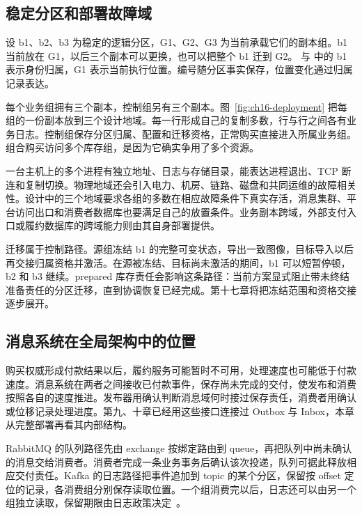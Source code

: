 
\subsection{稳定分区和部署故障域}

设 b1、b2、b3 为稳定的逻辑分区，G1、G2、G3 为当前承载它们的副本组。b1 当前放在 G1，以后三个副本可以更换，也可以把整个 b1 迁到 G2。 与  中的 b1 表示身份归属，G1 表示当前执行位置。编号随分区事实保存，位置变化通过归属记录表达。

每个业务组拥有三个副本，控制组另有三个副本。图~\ref{fig:ch16-deployment} 把每组的一份副本放到三个设计地域。每一行形成自己的复制多数，行与行之间各有业务日志。控制组保存分区归属、配置和迁移资格，正常购买直接进入所属业务组。组合购买访问多个库存组，是因为它确实争用了多个资源。


一台主机上的多个进程有独立地址、日志与存储目录，能表达进程退出、TCP 断连和复制切换。物理地域还会引入电力、机房、链路、磁盘和共同运维的故障相关性。设计中的三个地域要求各组的多数在相应故障条件下真实存活，消息集群、平台访问出口和消费者数据库也要满足自己的放置条件。业务副本跨域，外部支付入口或履约数据库的跨域能力则由其自身部署提供。

迁移属于控制路径。源组冻结 b1 的完整可变状态，导出一致图像，目标导入以后再交接归属资格并激活。在源被冻结、目标尚未激活的期间，b1 可以短暂停顿，b2 和 b3 继续。prepared 库存责任会影响这条路径：当前方案显式阻止带未终结准备责任的分区迁移，直到协调恢复已经完成。第十七章将把冻结范围和资格交接逐步展开。

\subsection{消息系统在全局架构中的位置}

购买权威形成付款结果以后，履约服务可能暂时不可用，处理速度也可能低于付款速度。消息系统在两者之间接收已付款事件，保存尚未完成的交付，使发布和消费按照各自的速度推进。发布器用确认判断消息域何时接过保存责任，消费者用确认或位移记录处理进度。第九、十章已经用这些接口连接过 Outbox 与 Inbox，本章从完整部署再看其内部结构。

RabbitMQ 的队列路径先由 exchange 按绑定路由到 queue，再把队列中尚未确认的消息交给消费者。消费者完成一条业务事务后确认该次投递，队列可据此释放相应交付责任。Kafka 的日志路径把事件追加到 topic 的某个分区，保留按 offset 定位的记录，各消费组分别保存读取位置。一个组消费完以后，日志还可以由另一个组独立读取，保留期限由日志政策决定~\cite{rabbitmq-queues,kafka-design}。

